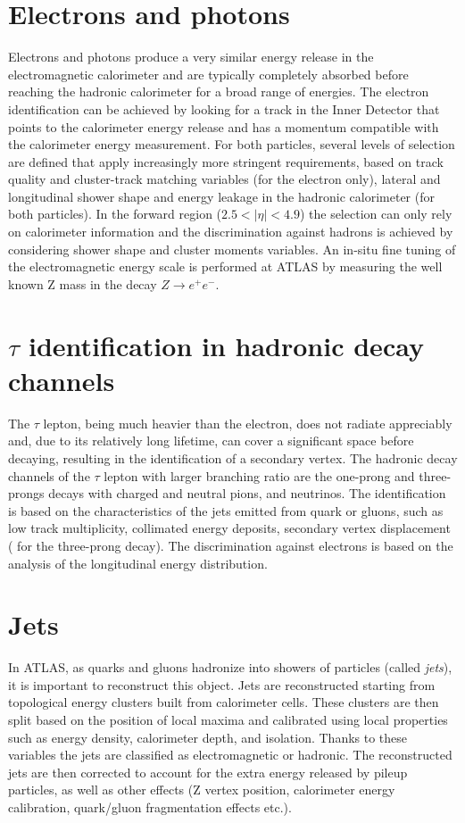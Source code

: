 \documentclass[a4paper,twoside,12pt]{book}
\begin{document}
\section{Electrons and photons}
Electrons and photons produce a very similar energy release in the electromagnetic calorimeter and are typically completely absorbed before reaching the hadronic calorimeter for a broad
 range of energies. The electron identification can be achieved by 
looking for a track in the Inner Detector that points to the calorimeter energy release and has a momentum compatible with the calorimeter energy measurement. For both particles, several levels of selection are defined that apply increasingly
more stringent requirements, based on track quality and cluster-track matching variables (for the electron only), lateral and longitudinal shower shape and energy leakage in the 
hadronic calorimeter (for both particles). In the forward region ($2.5 < |\eta| < 4.9$) the 
selection can only rely on calorimeter information and the discrimination against hadrons
is achieved by considering shower shape and cluster moments variables. An in-situ fine tuning
of the electromagnetic energy scale is performed at ATLAS by measuring the well known 
Z mass in the decay $Z \rightarrow e^+e^-$.

\section{$\tau$ identification in hadronic decay channels}
The $\tau$ lepton, being much heavier than the electron, does not radiate appreciably and, due to its relatively long lifetime, can cover a significant 
space before decaying, resulting in the identification of a secondary vertex.
The hadronic decay channels of the $\tau$ lepton with larger branching ratio are the 
one-prong and three-prongs decays with charged and neutral pions, and neutrinos. The
identification is based on the characteristics of the jets emitted from quark or gluons, such 
as low track multiplicity, collimated energy deposits, secondary vertex displacement (
for the three-prong decay). The discrimination against electrons is based on the analysis
of the longitudinal energy distribution. 

\section{Jets}\label{subsec:jets}
In ATLAS, as quarks and gluons hadronize into showers of particles (called \textit{jets}), it is important to reconstruct this object. Jets are reconstructed starting from topological energy clusters built from calorimeter cells. These clusters are then split based on the position of local maxima and calibrated using
local properties such as energy density, calorimeter depth, and isolation. Thanks to these 
variables the jets are classified as electromagnetic or hadronic. The reconstructed jets are
then corrected to account for the extra energy released by pileup particles, as well as other effects (Z vertex position, calorimeter
energy calibration, quark/gluon fragmentation effects etc.).
\end{document}
